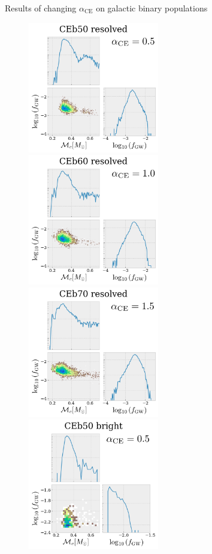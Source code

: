 \documentclass[twocolumn]{aastex631}
\newcommand*{\alphaCE}{\alpha_{\mathrm{CE}}}
\begin{document}
\begin{subsection}{Results of changing $\alphaCE{}$ on galactic binary populations}
\begin{figure}
\centering
\includegraphics[width=2.250in]{CEb50_m12i_intrinsic_resolved.png}
\includegraphics[width=2.250in]{CEb60_m12i_intrinsic_resolved.png}
\includegraphics[width=2.250in]{CEb70_m12i_intrinsic_resolved.png} \\
\includegraphics[width=2.250in]{CEb50_m12i_intrinsic_bright.png}

\end{figure}
\end{subsection}
\end{document}
